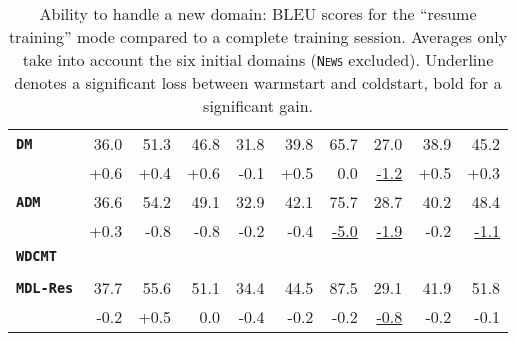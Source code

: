 \documentclass[11pt,a4paper]{article}
\newcommand{\fyTodo}[1]{\Todo[FY:]{\textcolor{orange}{#1}}}
\newcommand{\fyDone}[1]{\done[FY]\Todo[FY:]{\textcolor{orange}{#1}}}
\newcommand{\domain}[1]{\texttt{\textsc{#1}}}
\newcommand{\system}[1]{\texttt{\textbf{#1}}}
\newcommand{\SW}[1]{\underline{#1}}
\begin{document}
\begin{table*}
\begin{tabular}{|p{2.5cm}|*{9}{r|}}
    \system{DM}            &36.0 &51.3&46.8&31.8&39.8&65.7&27.0 & 38.9 & 45.2\\[-2pt]
                   & \scriptsize +0.6& \scriptsize +0.4& \scriptsize +0.6& \scriptsize -0.1& \scriptsize +0.5 & \scriptsize 0.0& \scriptsize \SW{-1.2}& \scriptsize +0.5 & \scriptsize +0.3\\    
    
    \system{ADM}          &36.6&54.2&49.1&32.9&42.1&75.7&28.7 & 40.2 & 48.4 \\[-2pt]
                   & \scriptsize +0.3 & \scriptsize -0.8 & \scriptsize -0.8 & \scriptsize -0.2 & \scriptsize -0.4 & \scriptsize \SW{-5.0} & \scriptsize \SW{-1.9} & \scriptsize -0.2 & \scriptsize \SW{-1.1}\\
    
    \system{WDCMT}     &&&&&&& & &\\[-2pt]
                    &&&&&&&&& \\

    \system{MDL-Res}    &37.7   & 55.6   & 51.1   & 34.4  & 44.5  & 87.5  & 29.1 & 41.9 & 51.8 \\[-2pt]
                        & \scriptsize -0.2 & \scriptsize +0.5 & \scriptsize 0.0 & \scriptsize -0.4  &  \scriptsize -0.2 & \scriptsize -0.2 & \scriptsize \SW{-0.8} & \scriptsize -0.2 & \scriptsize -0.1 \\
     \hline
  \end{tabular}
  \caption{Ability to handle a new domain: BLEU scores for the ``resume training'' mode compared to a complete training session. Averages only take into account the six initial domains (\domain{News} excluded). Underline denotes a significant loss between warmstart and coldstart, bold for a significant gain.}
  \label{tab:warmrestart}
  \fyTodo{Fill the table, significancy testing against initial learning condition, for each domain, and averages ? }
  \fyDone{Need correct number / differences for Mixed-Nat}
  \fyDone{averages include one more domain ? No for comparison}
  \fyDone{i used smaller number for differences (easier to read...)}
\end{table*}
\end{document}
